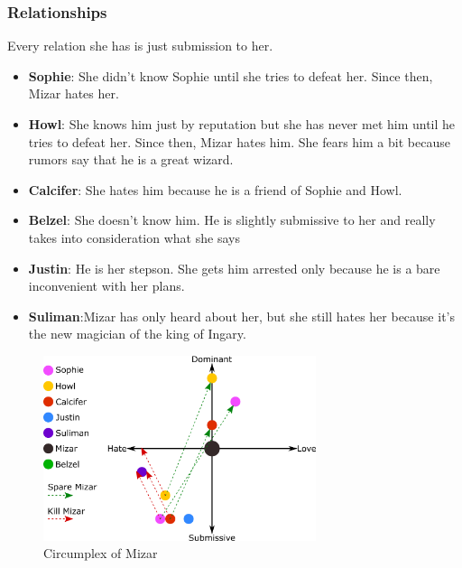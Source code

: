 
\subsubsection*{Relationships}
Every relation she has is just submission to her.
\begin{itemize}
\item \textbf{Sophie}: She didn’t know Sophie until she tries to defeat her. Since then, Mizar hates her.
\item \textbf{Howl}: She knows him just by reputation but she has never met him until he tries to defeat her. Since then, Mizar hates him. She fears him a bit because rumors say that he is a great wizard.
\item \textbf{Calcifer}: She hates him because he is a friend of Sophie and Howl.
\item \textbf{Belzel}: She doesn’t know him. He is slightly submissive to her and really takes into consideration what she says
\item \textbf{Justin}: He is her stepson. She gets him arrested only because he is a bare  inconvenient with her plans. 
\item \textbf{Suliman}:Mizar has only heard about her, but she still hates her because it’s the new magician of the king of Ingary.
\end{itemize}

\begin{figure}[H]
  \centering
  \includegraphics[width=8cm]{Images/SVG/Exported/Circumplexes/mizarCircumplex}
  \caption{Circumplex of Mizar}
\end{figure}

